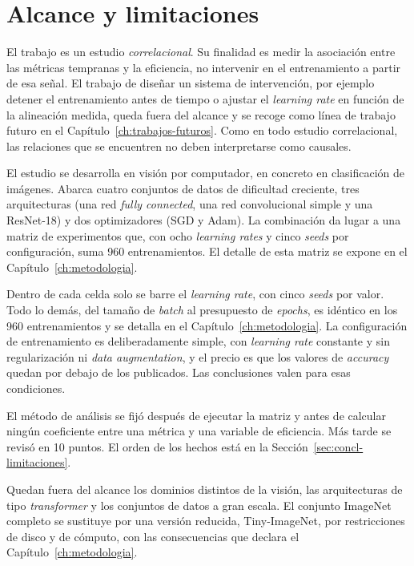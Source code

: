 \section{Alcance y limitaciones}
\label{sec:alcance}

El trabajo es un estudio \emph{correlacional}. Su finalidad es medir la asociación entre las métricas tempranas y la eficiencia, no intervenir en el entrenamiento a partir de esa señal. El trabajo de diseñar un sistema de intervención, por ejemplo detener el entrenamiento antes de tiempo o ajustar el \emph{learning rate} en función de la alineación medida, queda fuera del alcance y se recoge como línea de trabajo futuro en el Capítulo~\ref{ch:trabajos-futuros}. Como en todo estudio correlacional, las relaciones que se encuentren no deben interpretarse como causales.

El estudio se desarrolla en visión por computador, en concreto en clasificación de imágenes. Abarca cuatro conjuntos de datos de dificultad creciente, tres arquitecturas (una red \emph{fully connected}, una red convolucional simple y una ResNet-18) y dos optimizadores (SGD y Adam). La combinación da lugar a una matriz de experimentos que, con ocho \emph{learning rates} y cinco \emph{seeds} por configuración, suma 960 entrenamientos. El detalle de esta matriz se expone en el Capítulo~\ref{ch:metodologia}.

Dentro de cada celda solo se barre el \emph{learning rate}, con cinco \emph{seeds} por valor. Todo lo demás, del tamaño de \emph{batch} al presupuesto de \emph{epochs}, es idéntico en los 960 entrenamientos y se detalla en el Capítulo~\ref{ch:metodologia}. La configuración de entrenamiento es deliberadamente simple, con \emph{learning rate} constante y sin regularización ni \emph{data augmentation}, y el precio es que los valores de \emph{accuracy} quedan por debajo de los publicados. Las conclusiones valen para esas condiciones.

El método de análisis se fijó después de ejecutar la matriz y antes de calcular ningún coeficiente entre una métrica y una variable de eficiencia. Más tarde se revisó en 10 puntos. El orden de los hechos está en la Sección~\ref{sec:concl-limitaciones}.

Quedan fuera del alcance los dominios distintos de la visión, las arquitecturas de tipo \emph{transformer} y los conjuntos de datos a gran escala. El conjunto ImageNet completo se sustituye por una versión reducida, Tiny-ImageNet, por restricciones de disco y de cómputo, con las consecuencias que declara el Capítulo~\ref{ch:metodologia}.

